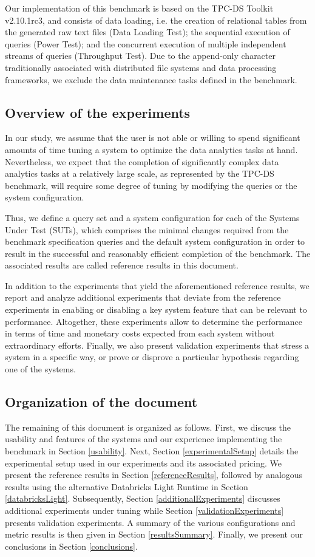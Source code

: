 Our implementation of this benchmark is based on the TPC-DS Toolkit v2.10.1rc3, and consists of data loading, i.e. the creation of relational tables from the generated raw text files (Data Loading Test); the sequential execution of queries (Power Test); and the concurrent execution of multiple independent streams of queries (Throughput Test). Due to the append-only character traditionally associated with distributed file systems and data processing frameworks, we exclude the data maintenance tasks defined in the benchmark.

\subsection{Overview of the experiments}
In our study, we assume that the user is not able or willing to spend significant amounts of time tuning a system to optimize the data analytics tasks at hand. Nevertheless, we expect that the completion of significantly complex data analytics tasks at a relatively large scale, as represented by the TPC-DS benchmark, will require some degree of tuning by modifying the queries or the system configuration.

Thus, we define a query set and a system configuration for each of the Systems Under Test (SUTs), which comprises the minimal changes required from the benchmark specification queries and the default system configuration in order to result in the successful and reasonably efficient completion of the benchmark. The associated results are called reference results in this document.

In addition to the experiments that yield the aforementioned reference results, we report and analyze additional experiments that deviate from the reference experiments in enabling or disabling a key system feature that can be relevant to performance. Altogether, these experiments allow to determine the performance in terms of time and monetary costs expected from each system without extraordinary efforts. Finally, we also present validation experiments that stress a system in a specific way, or prove or disprove a particular hypothesis regarding one of the systems.

\subsection{Organization of the document}
The remaining of this document is organized as follows. First, we discuss the usability and features of the systems and our experience implementing the benchmark in Section \ref{usability}. Next, Section \ref{experimentalSetup} details the experimental setup used in our experiments and its associated pricing. We present the reference results in Section \ref{referenceResults}, followed by analogous results using the alternative Databricks Light Runtime in Section \ref{databricksLight}. Subsequently, Section \ref{additionalExperiments} discusses additional experiments under tuning while Section \ref{validationExperiments} presents validation experiments. A summary of the various configurations and metric results is then given in Section \ref{resultsSummary}. Finally, we present our conclusions in Section \ref{conclusions}.


